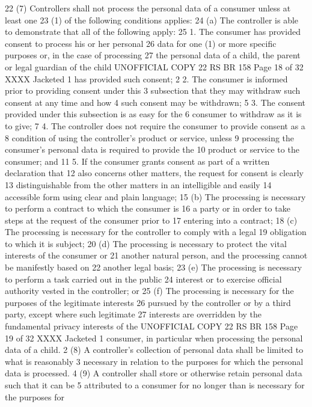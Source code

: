 22 (7) Controllers shall not process the personal data of a consumer unless at least one
23 (1) of the following conditions applies:
24 (a) The controller is able to demonstrate that all of the following apply:
25 1. The consumer has provided consent to process his or her personal
26 data for one (1) or more specific purposes or, in the case of processing
27 the personal data of a child, the parent or legal guardian of the child 
UNOFFICIAL COPY 22 RS BR 158
Page 18 of 32
XXXX Jacketed
1 has provided such consent;
2 2. The consumer is informed prior to providing consent under this
3 subsection that they may withdraw such consent at any time and how
4 such consent may be withdrawn;
5 3. The consent provided under this subsection is as easy for the
6 consumer to withdraw as it is to give;
7 4. The controller does not require the consumer to provide consent as a
8 condition of using the controller's product or service, unless
9 processing the consumer's personal data is required to provide the
10 product or service to the consumer; and
11 5. If the consumer grants consent as part of a written declaration that
12 also concerns other matters, the request for consent is clearly
13 distinguishable from the other matters in an intelligible and easily
14 accessible form using clear and plain language;
15 (b) The processing is necessary to perform a contract to which the consumer is
16 a party or in order to take steps at the request of the consumer prior to
17 entering into a contract;
18 (c) The processing is necessary for the controller to comply with a legal
19 obligation to which it is subject;
20 (d) The processing is necessary to protect the vital interests of the consumer or
21 another natural person, and the processing cannot be manifestly based on
22 another legal basis;
23 (e) The processing is necessary to perform a task carried out in the public
24 interest or to exercise official authority vested in the controller; or
25 (f) The processing is necessary for the purposes of the legitimate interests
26 pursued by the controller or by a third party, except where such legitimate
27 interests are overridden by the fundamental privacy interests of the 
UNOFFICIAL COPY 22 RS BR 158
Page 19 of 32
XXXX Jacketed
1 consumer, in particular when processing the personal data of a child.
2 (8) A controller's collection of personal data shall be limited to what is reasonably
3 necessary in relation to the purposes for which the personal data is processed.
4 (9) A controller shall store or otherwise retain personal data such that it can be
5 attributed to a consumer for no longer than is necessary for the purposes for
